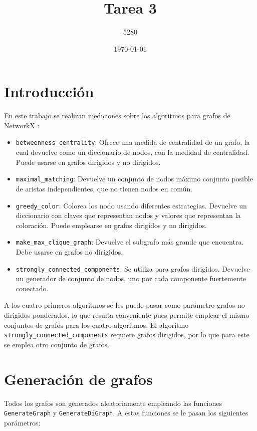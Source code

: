 \documentclass{article}
\title{
Tarea 3
}
\author{5280}
\date{\today}
\begin{document}
\maketitle

\section*{Introducción}

En este trabajo se realizan mediciones sobre los algoritmos para grafos de NetworkX \citep{networkx}:

\begin{itemize}
\item \texttt{betweenness\_centrality}: Ofrece una medida de centralidad de un grafo, la cual devuelve como un diccionario de nodos, con la medidad de centralidad. Puede usarse en grafos dirigidos y no dirigidos.

\item \texttt{maximal\_matching}: Devuelve un conjunto de nodos máximo conjunto posible de aristas independientes, que no tienen nodos en común. 

\item \texttt{greedy\_color}: Colorea los nodo usando diferentes estrategias. Devuelve un diccionario con claves que representan nodos y valores que representan la coloración. Puede emplearse en grafos dirigidos y no dirigidos.

\item \texttt{make\_max\_clique\_graph}: Devuelve el subgrafo más grande que encuentra. Debe usarse en grafos no dirigidos.
\item \texttt{strongly\_connected\_components}: Se utiliza para grafos dirigidos. Devuelve un generador de conjunto de nodos, uno por cada componente fuertemente conectado. 
\end{itemize}

A los cuatro primeros algoritmos se les puede pasar como parámetro grafos no dirigidos ponderados, lo que resulta conveniente pues permite emplear el mismo conjuntos de grafos para los cuatro algoritmos. El algoritmo \texttt{strongly\_connected\_components} requiere grafos dirigidos, por lo que para este se emplea otro conjunto de grafos.


\section*{Generación de grafos}
Todos los grafos son generados aleatoriamente empleando las funciones \texttt{GenerateGraph} y \texttt{GenerateDiGraph}. A estas funciones se le pasan los siguientes parámetros: 
\end{document}
